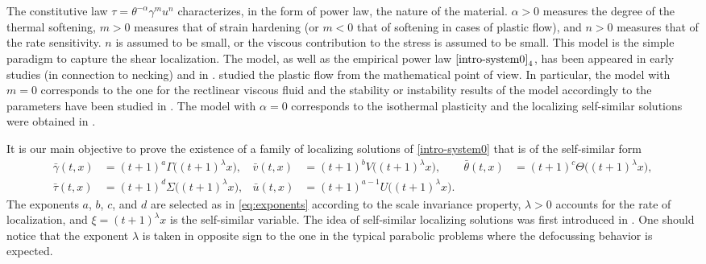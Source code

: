 \documentclass[a4paper,11pt]{article}
\def\bg{{\bar{\gamma}}}
\def\bv{{\bar{v}}}
\def\bth{{\bar{\theta}}}
\def\bu{{\bar{u}}}
\theoremstyle{remark}
\begin{document}
The constitutive law $\tau = \theta^{-\alpha}\gamma^m u^n$ characterizes, in the form of power law, the nature of the material. $\alpha>0$ measures the degree of the thermal softening, $m>0$ measures that of strain hardening (or $m<0$ that of softening in cases of plastic flow), and $n>0$ measures that of the rate sensitivity. $n$ is assumed to be small, or the viscous contribution to the stress is assumed to be small. This model is the simple paradigm to capture the shear localization. The model, as well as the empirical power law $\eqref{intro-system0}_4$, has been appeared in early studies \cite{HN77} (in connection to necking) and in \cite{WF83,FM87}. \cite{tzavaras_plastic_1986,tzavaras_strain_1991,tzavaras_nonlinear_1992} studied the plastic flow from the mathematical point of view. In particular, the model with $m=0$ corresponds to the one for the rectlinear viscous fluid and the stability or instability results of the model accordingly to the parameters have been studied in \cite{bertsch_effect_1991, DH_1983, Tz_1986, Tz_1987, KOT14, KLT_HYP2016}. The model with $\alpha=0$ corresponds to the isothermal plasticity and the localizing self-similar solutions were obtained in \cite{LT16, KLT_2016}.

%
%
%
%

It is our main objective to prove the existence of a family of localizing solutions of \eqref{intro-system0} that is of the self-similar form
\begin{equation} \label{intro-sols}
\begin{aligned}
 \bg(t,x) &= (t+1)^a\Gamma\big((t+1)^\lambda x\big), & \bv(t,x) &= (t+1)^bV\big((t+1)^\lambda x\big), & \bth(t,x) &= (t+1)^c\Theta\big((t+1)^\lambda x\big),\\
 \bar{\tau}(t,x) &= (t+1)^d\Sigma\big((t+1)^\lambda x\big), & \bu(t,x) &= (t+1)^{a-1}U\big((t+1)^\lambda x\big).
\end{aligned}
\end{equation}
The exponents $a$, $b$, $c$, and $d$ are selected as in \eqref{eq:exponents} according to the scale invariance property, $\lambda>0$ accounts for the rate of localization, and $\xi=(t+1)^\lambda x$ is the self-similar variable. The idea of self-similar localizing solutions was first introduced in \cite{KOT14}.   One should notice that the exponent $\lambda$ is taken in opposite sign to the one in the typical parabolic problems where the defocussing behavior is expected.
\end{document}
